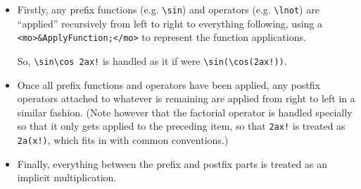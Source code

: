 \begin{itemize}
\item Firstly, any prefix functions (e.g. \verb|\sin|) and operators
(e.g. \verb|\lnot|) are ``applied'' recursively from left to right to
everything following, using a \verb|<mo>&ApplyFunction;</mo>| to represent the
function applications.

So, \verb|\sin\cos 2ax!| is handled as it if were \verb|\sin(\cos(2ax!))|.


\item Once all prefix functions and operators have been applied, any postfix
operators attached to whatever is remaining are applied from right to left in
a similar fashion.
(Note however that the factorial operator is handled specially so that it only
gets applied to the preceding item, so that \verb|2ax!| is treated as
\verb|2a(x!)|, which fits in with common conventions.)


\item Finally, everything between the prefix and postfix parts is treated as an
implicit multiplication.

\end{itemize}
